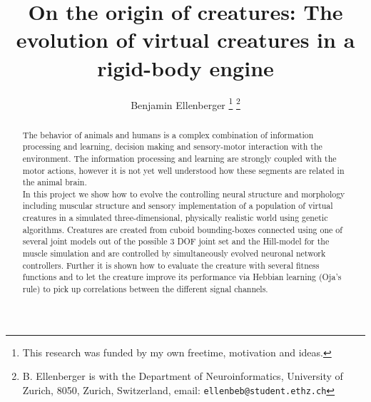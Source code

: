 \documentclass[letterpaper, 10 pt, conference]{ieeeconf}  %
\title{\LARGE \bf
On the origin of creatures: The evolution of virtual creatures in a rigid-body engine
}
\author{Benjamin Ellenberger%
\thanks{This research was funded by my own freetime, motivation and ideas.}%
\thanks{B. Ellenberger is with the Department of Neuroinformatics, University of Zurich, 8050, Zurich, Switzerland, email:
        {\tt\small  ellenbeb@student.ethz.ch}}%
}
\begin{document}
\maketitle
\thispagestyle{empty}
\pagestyle{empty}


\begin{abstract}


The behavior of animals and humans is a complex combination of information processing and learning, decision making and sensory-motor interaction with the environment. The information processing and learning are strongly coupled with the motor actions, however it is not yet well understood how these segments are related in the animal brain.
\\
In this project we show how to evolve the controlling neural structure and morphology including muscular structure and sensory implementation of a population of virtual creatures in a simulated three-dimensional, physically realistic world using genetic algorithms. Creatures are created from cuboid bounding-boxes connected using one of several joint models out of the possible 3 DOF joint set and the Hill-model for the muscle simulation and are controlled by simultaneously evolved neuronal network controllers. Further it is shown how to evaluate the creature with several fitness functions and to let the creature improve its performance via Hebbian learning (Oja's rule) to pick up correlations between the different signal channels.

\end{abstract}


\end{document}
